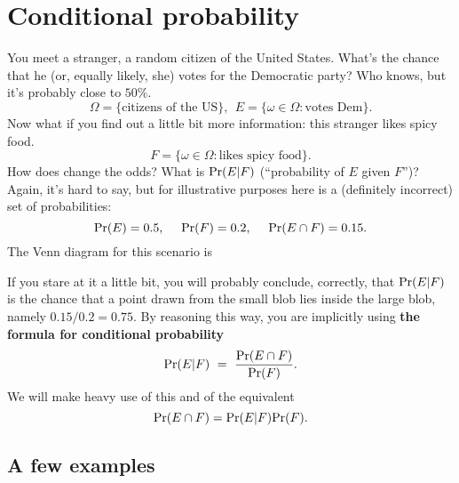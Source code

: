 \documentclass{report}
\theoremstyle{plain}
\theoremstyle{definition}
\newcommand{\pr}{\mbox{\rm Pr}}
\begin{document}
\section{Conditional probability}

You meet a stranger, a random citizen of the United States. What's the chance that he (or, equally likely, she) votes for the Democratic party? Who knows, but it's probably close to $50\%$.
$$ \Omega = \{\mbox{citizens of the US}\}, \ \ E = \{\omega \in \Omega: \mbox{votes Dem}\}.$$
Now what if you find out a little bit more information: this stranger likes spicy food.
$$ F = \{\omega \in \Omega: \mbox{likes spicy food}\}.$$
How does change the odds? What is $\pr(E|F)$ (``probability of $E$ given $F$'')? Again, it's hard to say, but for illustrative purposes here is a (definitely incorrect) set of probabilities:
$$ \pr(E) = 0.5, \ \ \ \ \pr(F) = 0.2, \ \ \ \ \pr(E \cap F) = 0.15.$$
The Venn diagram for this scenario is

\begin{center}
\end{center}

\noindent
If you stare at it a little bit, you will probably conclude, correctly, that $\pr(E|F)$ is the chance that a point drawn from the small blob lies inside the large blob, namely $0.15/0.2 = 0.75$. By reasoning this way, you are implicitly using {\bf the formula for conditional probability}
$$ \pr(E|F) \ = \ \frac{\pr(E \cap F)}{\pr(F)} .$$
We will make heavy use of this and of the equivalent
$$ \pr(E \cap F) = \pr(E|F) \pr(F).$$

\subsection{A few examples}
\end{document}
